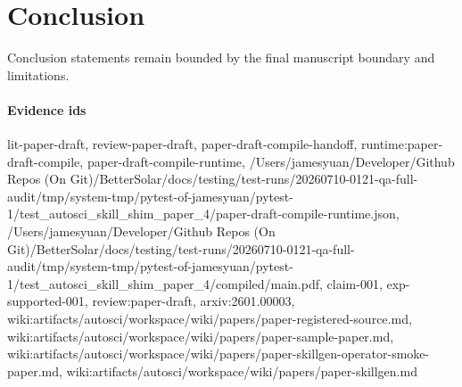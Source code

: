 \section{Conclusion}
Conclusion statements remain bounded by the final manuscript boundary and limitations.

\paragraph{Evidence ids} lit-paper-draft, review-paper-draft, paper-draft-compile-handoff, runtime:paper-draft-compile, paper-draft-compile-runtime, /Users/jamesyuan/Developer/Github Repos (On Git)/BetterSolar/docs/testing/test-runs/20260710-0121-qa-full-audit/tmp/system-tmp/pytest-of-jamesyuan/pytest-1/test\_autosci\_skill\_shim\_paper\_4/paper-draft-compile-runtime.json, /Users/jamesyuan/Developer/Github Repos (On Git)/BetterSolar/docs/testing/test-runs/20260710-0121-qa-full-audit/tmp/system-tmp/pytest-of-jamesyuan/pytest-1/test\_autosci\_skill\_shim\_paper\_4/compiled/main.pdf, claim-001, exp-supported-001, review:paper-draft, arxiv:2601.00003, wiki:artifacts/autosci/workspace/wiki/papers/paper-registered-source.md, wiki:artifacts/autosci/workspace/wiki/papers/paper-sample-paper.md, wiki:artifacts/autosci/workspace/wiki/papers/paper-skillgen-operator-smoke-paper.md, wiki:artifacts/autosci/workspace/wiki/papers/paper-skillgen.md
